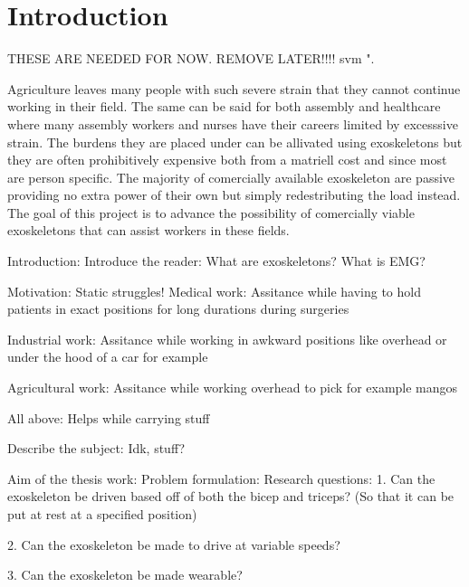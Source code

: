 \section{Introduction}
\label{section:intro}

THESE ARE NEEDED FOR NOW. REMOVE LATER!!!! \cite{IEEEtran, IEEEtranformatexample, webpage, FundConDep, exampleofjournalarticle, exampleofconferencepaper}
\ac{svm} \cite{exampleofconferencepaper}".


Agriculture leaves many people with such severe strain that they cannot continue working in their field. The same can be said 
for both assembly and healthcare where many assembly workers and nurses have their careers limited by excesssive strain. The 
burdens they are placed under can be allivated using exoskeletons but they are often prohibitively expensive both from a 
matriell cost and since most are person specific. The majority of comercially available exoskeleton are passive providing no 
extra power of their own but simply redestributing the load instead. The goal of this project is to advance the possibility of 
comercially viable exoskeletons that can assist workers in these fields.

Introduction:
    Introduce the reader:
        What are exoskeletons?
        What is EMG?

    Motivation:
        Static struggles!
            Medical work:
                Assitance while having to hold patients in exact positions for long durations during surgeries

            Industrial work:
                Assitance while working in awkward positions like overhead or under the hood of a car for example

            Agricultural work:
                Assitance while working overhead to pick for example mangos
            
            All above:
                Helps while carrying stuff

    Describe the subject:
        Idk, stuff?

    Aim of the thesis work:
        Problem formulation: %
            Research questions:
                1.	Can the exoskeleton be driven based off of both the bicep and triceps? (So that it can be put at rest at a specified position)

                2.	Can the exoskeleton be made to drive at variable speeds?

                3.	Can the exoskeleton be made wearable?

